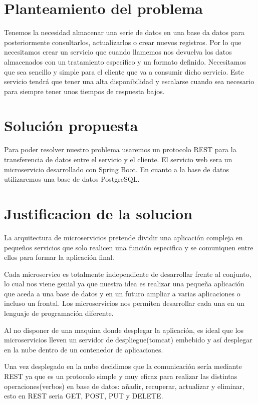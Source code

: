 \documentclass[12pt]{report} %
\begin{document}
	\section{Planteamiento del problema}
	Tenemos la necesidad almacenar una serie de datos en una base da datos para posteriormente consultarlos, actualizarlos o crear nuevos registros. Por lo que necesitamos crear un servicio que cuando llamemos nos devuelva los datos almacenados con un tratamiento especifico y un formato definido. Necesitamos que sea sencillo y simple para el cliente que va a consumir dicho servicio. 
	Este servicio tendrá que tener una alta disponibilidad y escalarse cuando sea necesario para siempre tener unos tiempos de respuesta bajos.
	\section{Solución propuesta}
	Para poder resolver nuestro problema usaremos un protocolo REST para la transferencia de datos entre el servicio y el cliente. El servicio web sera un microservicio desarrollado con Spring Boot. En cuanto a la base de datos utilizaremos una base de datos PostgreSQL.
	\section{Justificacion de la solucion}
	
	La arquitectura de microservicios pretende dividir una aplicación compleja en pequeños servicios que solo realicen una función especifica y se comuniquen entre ellos para formar la aplicación final.
	
	Cada microservico es totalmente independiente de desarrollar frente al conjunto, lo cual nos viene genial ya que nuestra idea es realizar una pequeña aplicación que aceda a una base de datos y en un futuro ampliar a varias aplicaciones o incluso un frontal. Los microservicios nos permiten desarrollar cada una en un lenguaje de programación diferente.
	
	Al no disponer de una maquina donde desplegar la aplicación, es ideal que los microservicios lleven un servidor de despliegue(tomcat) embebido y así desplegar en la nube dentro de un contenedor de aplicaciones.
	
	Una vez desplegado en la nube decidimos que la comunicación sería mediante REST ya que es un protocolo simple y muy eficaz para realizar las distintas operaciones(verbos) en base de datos: añadir, recuperar, actualizar y eliminar, esto en REST seria GET, POST, PUT y DELETE.
	
\end{document}
